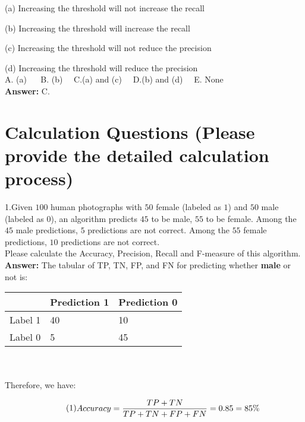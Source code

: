 \documentclass{article}
\begin{document}
    (a) Increasing the threshold will not increase the recall
    
    (b) Increasing the threshold will increase the recall
    
    (c) Increasing the threshold will not reduce the precision
    
    (d) Increasing the threshold will reduce the precision 
    ~\\
    
    A. (a) $\quad$ B. (b)$\quad$ C.(a) and (c)$\quad$ D.(b) and (d)$\quad$ E. None \\ 
    
    \textbf{Answer:} C. \\

\newpage
\section{Calculation Questions (Please provide the detailed calculation process)}

\noindent 1.Given $100$ human photographs with $50$ female (labeled as $1$) and $50$ male (labeled as $0$), an algorithm predicts $45$ to be male, $55$ to be female. Among the $45$ male predictions, $5$ predictions are not correct. Among the $55$ female predictions, $10$ predictions are not correct. \\
Please calculate the Accuracy, Precision, Recall and F-measure of this algorithm.  \\

\textbf{Answer:} The tabular of TP, TN, FP, and FN for predicting whether \textbf{male} or not is: \\

\begin{tabular}{|l|l|l|} %
\hline 
&Prediction 1&Prediction 0\\
\hline  
Label 1&40&10\\
\hline 
Label 0&5&45 \\
\hline
\end{tabular}  \\ \\

Therefore, we have: 

\begin{equation}{\tag{1}}
    \begin{aligned}
        Accuracy = \frac{TP + TN}{TP + TN + FP + FN} = 0.85 = 85\%
    \end{aligned}
\end{equation}
\end{document}
